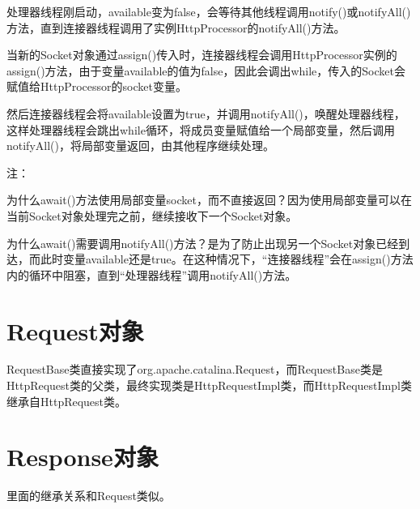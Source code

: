 处理器线程刚启动，available变为false，会等待其他线程调用notify()或notifyAll()方法，直到连接器线程调用了实例HttpProcessor的notifyAll()方法。
\par 当新的Socket对象通过assign()传入时，连接器线程会调用HttpProcessor实例的assign()方法，由于变量available的值为false，因此会调出while，传入的Socket会赋值给HttpProcessor的socket变量。
\par 然后连接器线程会将available设置为true，并调用notifyAll()，唤醒处理器线程，这样处理器线程会跳出while循环，将成员变量赋值给一个局部变量，然后调用notifyAll()，将局部变量返回，由其他程序继续处理。
\par 注：
\par 为什么await()方法使用局部变量socket，而不直接返回？因为使用局部变量可以在当前Socket对象处理完之前，继续接收下一个Socket对象。
\par 为什么await()需要调用notifyAll()方法？是为了防止出现另一个Socket对象已经到达，而此时变量available还是true。在这种情况下，“连接器线程”会在assign()方法内的循环中阻塞，直到“处理器线程”调用notifyAll()方法。
\section{Request对象}
RequestBase类直接实现了org.apache.catalina.Request，而RequestBase类是HttpRequest类的父类，最终实现类是HttpRequestImpl类，而HttpRequestImpl类继承自HttpRequest类。
\section{Response对象}
里面的继承关系和Request类似。
